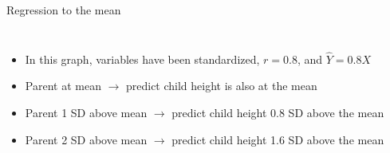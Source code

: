 \documentclass{beamer}\usepackage[]{graphicx}\usepackage[]{color}
\newenvironment{knitrout}{}{} %
\begin{document}
\begin{darkframes}
    \begin{frame}{Regression to the mean}
      \begin{columns}[onlytextwidth]
          \begin{itemize}
            \item In this graph, variables have been standardized, $r=0.8$, and $\hat Y = 0.8X$
            \item Parent at mean $\to$ predict child height is also at the mean
            \item Parent 1 SD above mean $\to$ predict child height 0.8 SD above the mean
            \item Parent 2 SD above mean $\to$ predict child height 1.6 SD above the mean
          \end{itemize}
\begin{knitrout}


\end{knitrout}
      \end{columns}

    \end{frame}

  \end{darkframes}
\end{document}
